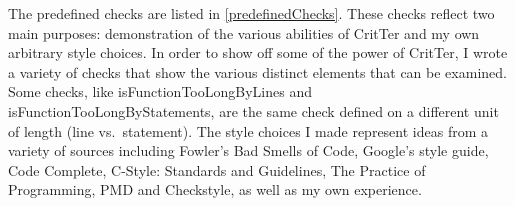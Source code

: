 \documentclass[12pt]{report}
\newcommand{\programName}{CritTer\xspace}
\begin{document}
The predefined checks are listed in \autoref{predefinedChecks}. These checks reflect two main 
purposes: demonstration of the various abilities of \programName and my own arbitrary style choices. In 
order to show off some of the power of \programName, I wrote a variety of checks that show the various 
distinct elements that can be examined. Some checks, like isFunctionTooLongByLines and 
isFunctionTooLongByStatements, are the same check defined on a different unit of length (line vs.\ 
statement). The style choices I made represent ideas from a variety of sources including Fowler's Bad 
Smells of Code\cite{refactoring}, Google's style guide\cite{googleStyle}, Code 
Complete\cite{code-complete}, C-Style: Standards and Guidelines\cite{standards}, The Practice of 
Programming\cite{practice-of-programming}, PMD\cite{pmd} and Checkstyle\cite{checkstyle}, as well as 
my own experience.
\end{document}
